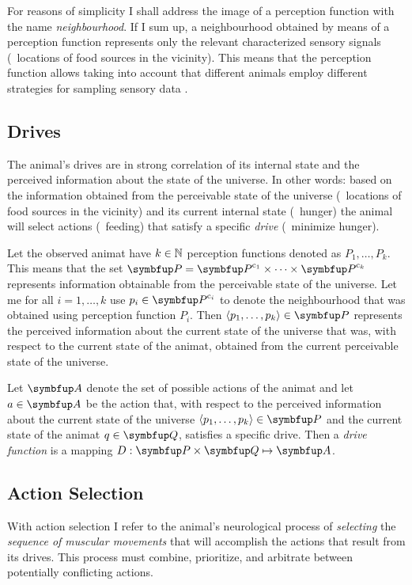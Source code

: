 For reasons of simplicity I shall address the image of a perception function with the name \emph{neighbourhood}. If I sum up, a neighbourhood obtained by means of a perception function represents only the relevant characterized sensory signals (\eg\ locations of food sources in the vicinity). This means that the perception function allows taking into account that different animals employ different strategies for sampling sensory data \cite{cliff:1993}.

\subsection{Drives}
The animal's drives are in strong correlation of its internal state and the perceived information about the state of the universe. In other words: based on the information obtained from the perceivable state of the universe (\eg\ locations of food sources in the vicinity) and its current internal state (\eg\ hunger) the animal will select actions (\eg\ feeding) that satisfy a specific \emph{drive} (\eg\ minimize hunger).

Let the observed animat have $k \in \mathbb{N}$ perception functions denoted as $P_1,\ldots,P_k$. This means that the set $\set{P}=\set{P}^{\mathrm{c}_1} \times \cdots \times \set{P}^{\mathrm{c}_k}$ represents information obtainable from the perceivable state of the universe. Let me for all $i=1,\ldots,k$ use $p_i \in  \set{P}^{\mathrm{c}_i}$ to denote the neighbourhood that was obtained using perception function $P_i$. Then $\langle p_1,\ldots,p_k\rangle \in \set{P}$ represents the perceived information about the current state of the universe that was, with respect to the current state of the animat, obtained from the current perceivable state of the universe.

\begin{definition}
  \label{def:animat:Dj}
  Let $\set{A}$ denote the set of possible actions of the animat and let $a \in \set{A}$ be the action that, with respect to the perceived information about the current state of the universe $\langle p_1,\ldots,p_k\rangle \in \set{P}$ and the current state of the animat $q \in \set{Q}$, satisfies a specific drive. Then a \emph{drive function} is a mapping $D: \set{P} \times \set{Q} \mapsto \set{A}$.
\end{definition}

\subsection{Action Selection}
With action selection I refer to the animal's neurological process of \emph{selecting} the \emph{sequence of muscular movements} that will accomplish the actions that result from its drives. This process must combine, prioritize, and arbitrate between potentially conflicting actions.

